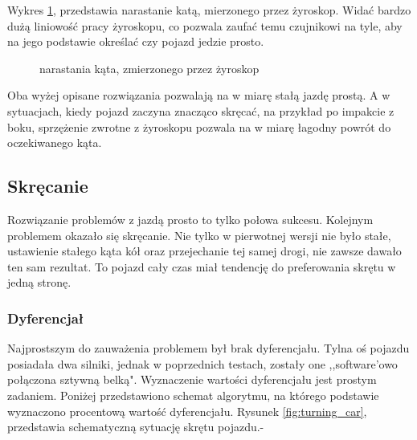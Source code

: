         Wykres \ref{plot:delta_angle_with_gyro}, przedstawia narastanie katą, mierzonego przez żyroskop.
        Widać bardzo dużą liniowość pracy żyroskopu, co pozwala zaufać temu czujnikowi na tyle, aby na jego podstawie określać czy pojazd jedzie prosto.

        \begin{figure}[!ht]
            \centering
                \renewcommand{\figurename}{Wykres}
                \caption{narastania kąta, zmierzonego przez żyroskop}
                \label{plot:delta_angle_with_gyro}
        \end{figure}


    \newpage
    Oba wyżej opisane rozwiązania pozwalają na w miarę stałą jazdę prostą.
    A w sytuacjach, kiedy pojazd zaczyna znacząco skręcać, na przykład po impakcie z boku, sprzężenie zwrotne z żyroskopu pozwala na w miarę łagodny powrót do oczekiwanego kąta.

    \subsection{Skręcanie}
        Rozwiązanie problemów z jazdą prosto to tylko połowa sukcesu.
        Kolejnym problemem okazało się skręcanie. 
        Nie tylko w pierwotnej wersji nie było stałe, ustawienie stałego kąta kół oraz przejechanie tej samej drogi, nie zawsze dawało ten sam rezultat.
        To pojazd cały czas miał tendencję do preferowania skrętu w jedną stronę.
        
        \subsubsection{Dyferencjał}
        \label{subsubsec:dyferencjal}
        Najprostszym do zauważenia problemem był brak dyferencjału. 
        Tylna oś pojazdu posiadała dwa silniki, jednak w poprzednich testach, zostały one ,,software'owo połączona sztywną belką".
        Wyznaczenie wartości dyferencjału jest prostym zadaniem. Poniżej przedstawiono schemat algorytmu, na którego podstawie wyznaczono procentową wartość dyferencjału.
        Rysunek \ref{fig:turning_car}, przedstawia schematyczną sytuację skrętu pojazdu.-
        

